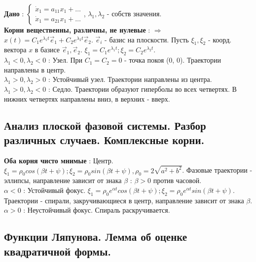 \documentclass[unicode, 8pt, a4paper,oneside, landscape]{article}
\begin{document}
\begin{multicols}{4}
{\bf Дано} : $\begin{cases}\dot{x}_1 = a_{11}x_1 + \ldots \\ \dot{x}_1 = a_{21}x_1 + \ldots \end{cases}$, $\lambda_1, \lambda_2$ - собств значения.\\
{\bf Корни вещественны, различны, не нулевые} : $\Rightarrow$ $x(t) = C_1e^{\lambda_1 t}\vec{e}_1 + C_2e^{\lambda_2 t}\vec{e}_2$. $\vec{e}_i$ - базис на плоскости. Пусть $\xi_1, \xi_2$ - коорд. вектора $x$ в базисе $\vec{e}_1, \vec{e}_2$. $\xi_1 = C_1e^{\lambda_1t}; \xi_2 = C_2e^{\lambda_2t}$.\\
{\bf $\lambda_1 < 0, \lambda_2 < 0$} : Узел. При $C_1 = C_2 = 0$ - точка покоя (0, 0). Траектории направлены в центр.\\
{\bf $\lambda_1 > 0, \lambda_2 > 0$} : Устойчивый узел. Траектории направлены из центра.\\
{\bf $\lambda_1 > 0, \lambda_2 < 0$} : Седло. Траектории образуют гиперболы во всех четвертях. В нижних четвертях направлены вниз, в верхних - вверх.\\


\subsection{Анализ плоской фазовой системы. Разбор различных случаев. Комплексные корни.}

{\bf Оба корня чисто мнимые} : Центр. $\xi_1 = \rho_0cos(\beta t + \psi); \xi_2 = \rho_0sin(\beta t + \psi), \rho_0 = 2\sqrt{a^2 + b^2}$. Фазовые траектории - эллипсы, направление зависит от знака $\beta$ : $\beta > 0$ против часовой.\\
{\bf $\alpha < 0$} : Устойчивый фокус. $\xi_1 = \rho_0e^{\alpha t} cos(\beta t + \psi); \xi_2 = \rho_0 e^{\alpha t} sin(\beta t + \psi)$. Траектории - спирали, закручивающиеся в центр, направление зависит от знака $\beta$.\\
{\bf $\alpha > 0$} : Неустойчивый фокус. Спираль раскручивается.\\


\subsection{Функции Ляпунова. Лемма об оценке квадратичной формы.}


\end{multicols}
\end{document}
